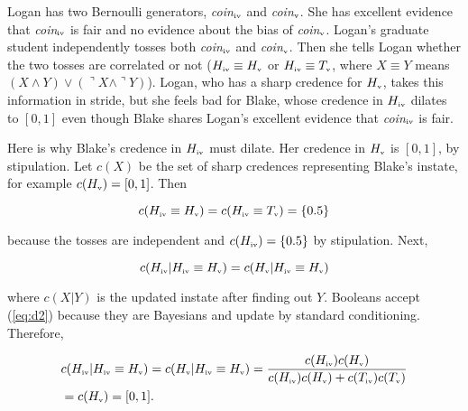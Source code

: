 \documentclass[11pt]{article}
\begin{document}
\begin{quotex}
  \label{ex:dilation} Logan has two Bernoulli
  generators, \textit{coin}$_{\mbox{\tiny{iv}}}$ and
  \textit{coin}$_{\mbox{\tiny{v}}}$. She has excellent evidence that
  \textit{coin}$_{\mbox{\tiny{iv}}}$ is fair and no evidence about the
  bias of \textit{coin}$_{\mbox{\tiny{v}}}$. Logan's graduate student
  independently tosses both \textit{coin}$_{\mbox{\tiny{iv}}}$ and
  \textit{coin}$_{\mbox{\tiny{v}}}$. Then she tells Logan whether the
  two tosses are correlated or not
  ($H_{\mbox{\tiny{iv}}}\equiv{}H_{\mbox{\tiny{v}}}$ or
  $H_{\mbox{\tiny{iv}}}\equiv{}T_{\mbox{\tiny{v}}}$, where
  $X\equiv{}Y$ means
  $(X\wedge{}Y)\vee(\urcorner{}X\wedge\urcorner{}Y)$). Logan, who has
  a sharp credence for $H_{\mbox{\tiny{v}}}$, takes this information
  in stride, but she feels bad for Blake, whose credence in
  $H_{\mbox{\tiny{iv}}}$ dilates to $[0,1]$ even though Blake shares
  Logan's excellent evidence that \textit{coin}$_{\mbox{\tiny{iv}}}$
  is fair.
\end{quotex}

Here is why Blake's credence in $H_{\mbox{\tiny{iv}}}$ must dilate. Her
credence in $H_{\mbox{\tiny{v}}}$ is $[0,1]$, by stipulation. Let
$c(X)$ be the set of sharp credences representing Blake's instate, for
example $c(H_{\mbox{\tiny{v}}})=[0,1]$. Then

\begin{equation}
  \label{eq:d1}
  c(H_{\mbox{\tiny{iv}}}\equiv{}H_{\mbox{\tiny{v}}})=c(H_{\mbox{\tiny{iv}}}\equiv{}T_{\mbox{\tiny{v}}})=\{0.5\}
\end{equation}

because the tosses are independent and
$c(H_{\mbox{\tiny{iv}}})=\{0.5\}$ by stipulation. Next,

\begin{equation}
  \label{eq:d2}
  c(H_{\mbox{\tiny{iv}}}|H_{\mbox{\tiny{iv}}}\equiv{}H_{\mbox{\tiny{v}}})=c(H_{\mbox{\tiny{v}}}|H_{\mbox{\tiny{iv}}}\equiv{}H_{\mbox{\tiny{v}}})
\end{equation}

where $c(X|Y)$ is the updated instate after finding out $Y$. Booleans
accept (\ref{eq:d2}) because they are Bayesians and update by standard
conditioning. Therefore,

\begin{align}
  \label{eq:d3}
  &c(H_{\mbox{\tiny{iv}}}|H_{\mbox{\tiny{iv}}}\equiv{}H_{\mbox{\tiny{v}}})=c(H_{\mbox{\tiny{v}}}|H_{\mbox{\tiny{iv}}}\equiv{}H_{\mbox{\tiny{v}}})=\frac{c(H_{\mbox{\tiny{iv}}})c(H_{\mbox{\tiny{v}}})}{c(H_{\mbox{\tiny{iv}}})c(H_{\mbox{\tiny{v}}})+c(T_{\mbox{\tiny{iv}}})c(T_{\mbox{\tiny{v}}})} \notag \\
  &=c(H_{\mbox{\tiny{v}}})=[0,1].
\end{align}
\end{document}
